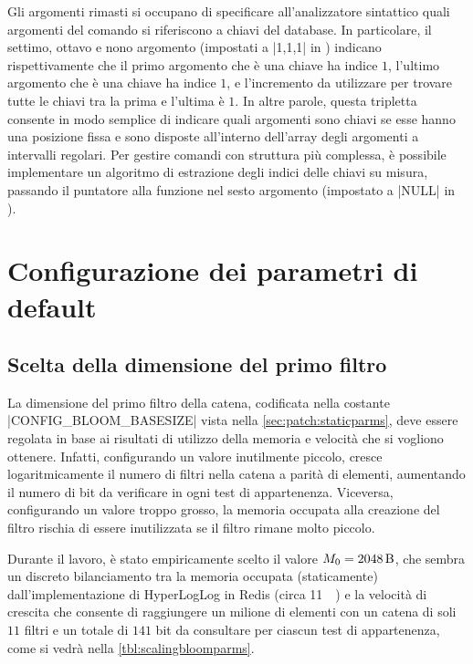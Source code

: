Gli argomenti rimasti si occupano di specificare all'analizzatore sintattico quali argomenti del
comando si riferiscono a chiavi del database. In particolare, il settimo, ottavo e nono argomento
(impostati a \cverb|1,1,1| in ) indicano rispettivamente che il primo argomento che è
una chiave ha indice $1$, l'ultimo argomento che è una chiave ha indice $1$, e l'incremento da
utilizzare per trovare tutte le chiavi tra la prima e l'ultima è $1$. In altre parole, questa
tripletta consente in modo semplice di indicare quali argomenti sono chiavi se esse hanno una
posizione fissa e sono disposte all'interno dell'array degli argomenti a intervalli regolari. Per
gestire comandi con struttura più complessa, è possibile implementare un algoritmo di estrazione
degli indici delle chiavi su misura, passando il puntatore alla funzione nel sesto argomento
(impostato a \cverb|NULL| in ).


\section{Configurazione dei parametri di default}

\subsection{Scelta della dimensione del primo filtro}
\label{sec:patch:basesize}

La dimensione del primo filtro della catena, codificata nella costante \cverb|CONFIG_BLOOM_BASESIZE|
vista nella \autoref{sec:patch:staticparms}, deve essere regolata in base ai risultati di utilizzo
della memoria e velocità che si vogliono ottenere. Infatti, configurando un valore inutilmente
piccolo, cresce logaritmicamente il numero di filtri nella catena a parità di elementi, aumentando
il numero di bit da verificare in ogni test di appartenenza. Viceversa, configurando un valore
troppo grosso, la memoria occupata alla creazione del filtro rischia di essere inutilizzata se
il filtro rimane molto piccolo.

Durante il lavoro, è stato empiricamente scelto il valore $M_0 = \SI{2048}{\byte}$, che sembra un
discreto bilanciamento tra la memoria occupata (staticamente) dall'implementazione di HyperLogLog in
Redis (circa \SI{11}{\kibi\byte}) e la velocità di crescita che consente di raggiungere un milione
di elementi con un catena di soli $11$ filtri e un totale di $141$ bit da consultare per ciascun
test di appartenenza, come si vedrà nella \autoref{tbl:scalingbloomparms}.

